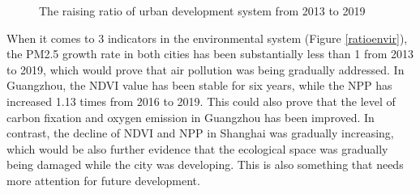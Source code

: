 \begin{figure}[H]
\centering
{}
\quad
{}

\caption{The raising ratio of urban development system from 2013 to 2019}
\label{ratiourban}
\end{figure}

When it comes to 3 indicators in the environmental system (Figure \ref{ratioenvir}), the PM2.5 growth rate in both cities has been substantially less than 1 from 2013 to 2019, which would prove that air pollution was being gradually addressed. In Guangzhou, the NDVI value has been stable for six years, while the NPP has increased 1.13 times from 2016 to 2019. This could also prove that the level of carbon fixation and oxygen emission in Guangzhou has been improved. In contrast, the decline of NDVI and NPP in Shanghai was gradually increasing, which would be also further evidence that the ecological space was gradually being damaged while the city was developing. This is also something that needs more attention for future development.\\

